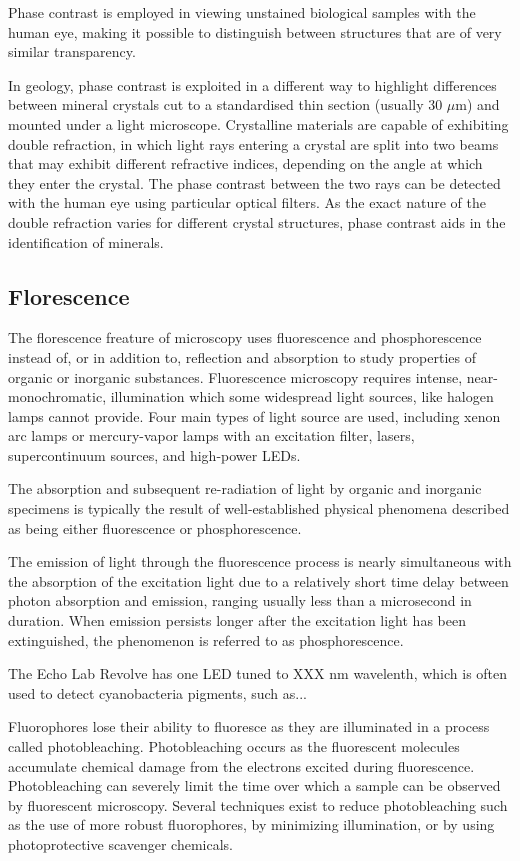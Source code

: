 \documentclass[12pt]{../SOP3_beta}
\begin{document}
\NP Phase contrast is employed in viewing unstained biological samples with the human eye, making it possible to distinguish between structures that are of very similar transparency.

\NP In geology, phase contrast is exploited in a different way to highlight differences between mineral crystals cut to a standardised thin section (usually 30 $\mu$m) and mounted under a light microscope. Crystalline materials are capable of exhibiting double refraction, in which light rays entering a crystal are split into two beams that may exhibit different refractive indices, depending on the angle at which they enter the crystal. The phase contrast between the two rays can be detected with the human eye using particular optical filters. As the exact nature of the double refraction varies for different crystal structures, phase contrast aids in the identification of minerals.

\subsection*{Florescence}

\NP The florescence freature of microscopy uses fluorescence and phosphorescence instead of, or in addition to, reflection and absorption to study properties of organic or inorganic substances. 
\NP Fluorescence microscopy requires intense, near-monochromatic, illumination which some widespread light sources, like halogen lamps cannot provide. Four main types of light source are used, including xenon arc lamps or mercury-vapor lamps with an excitation filter, lasers, supercontinuum sources, and high-power LEDs. 

\NP The absorption and subsequent re-radiation of light by organic and inorganic specimens is typically the result of well-established physical phenomena described as being either fluorescence or phosphorescence. 

\NP The emission of light through the fluorescence process is nearly simultaneous with the absorption of the excitation light due to a relatively short time delay between photon absorption and emission, ranging usually less than a microsecond in duration. When emission persists longer after the excitation light has been extinguished, the phenomenon is referred to as phosphorescence.

\NP The Echo Lab Revolve has one LED tuned to XXX nm wavelenth, which is often used to detect cyanobacteria pigments, such as...


\NP Fluorophores lose their ability to fluoresce as they are illuminated in a process called photobleaching. Photobleaching occurs as the fluorescent molecules accumulate chemical damage from the electrons excited during fluorescence. Photobleaching can severely limit the time over which a sample can be observed by fluorescent microscopy. Several techniques exist to reduce photobleaching such as the use of more robust fluorophores, by minimizing illumination, or by using photoprotective scavenger chemicals.
\end{document}
